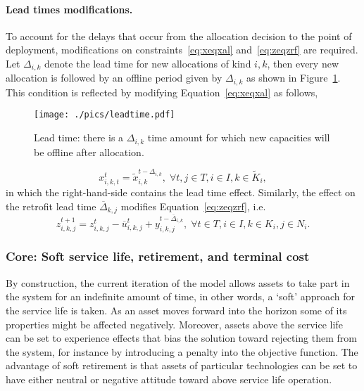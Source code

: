 \documentclass{amsart}
\begin{document}
\paragraph{Lead times modifications.}
To account for the delays that occur from the allocation decision to the point
of deployment, modifications on constraints~\eqref{eq:xeqxal} 
and~\eqref{eq:zeqzrf} are required. 
%
%
%
Let $\Delta_{i,k}$ denote the lead time for new allocations of kind $i,k$, then
every new allocation is followed by an offline period given by $\Delta_{i,k}$ as
shown in Figure~\ref{fig:leadTime}. This condition is reflected by modifying
Equation~\eqref{eq:xeqxal} as follows,
%
\begin{figure}[ht]
    \centering
    \texttt{[image: ./pics/leadtime.pdf]}
    \caption{Lead time: there is a $\Delta_{i,k}$ time amount for which new
    capacities will be offline after allocation.} \label{fig:leadTime}
\end{figure}
%
\begin{equation}
    x^t_{i,k,t} = \tilde{x}^{t-\Delta_{i,k}}_{i,k}, \; 
    \forall t,j\in T, i\in I, k\in \tilde{K}_i,
\end{equation}
%
in which the right-hand-side contains the lead time effect. 
%
Similarly, the effect on the retrofit lead time $\overline{\Delta}_{k,j}$
modifies Equation~\eqref{eq:zeqzrf}, i.e.
%
\begin{equation}
    z^{t+1}_{i,k,j} = z^{t}_{i,k,j} - \overline{u}^t_{i,k,j} + 
    y^{t-\overline{\Delta}_{i,k}}_{i,k,j},\;
    \forall 
  t \in T, i \in I, k \in K_i, j \in N_i.
\end{equation}
%
%

\subsubsection{Core: Soft service life, retirement, and terminal cost}
%
By construction, the current iteration of the model allows assets to take part
in the system for an indefinite amount of time, in other words, a `soft'
approach for the service life is taken. As an asset moves forward into the
horizon some of its properties might be affected negatively. Moreover, assets
above the service life can be set to experience effects that bias
the solution toward rejecting them from the system, for instance by introducing
a penalty into the objective function. The advantage of soft
retirement is that assets of particular technologies can be set to have either
neutral or negative attitude toward above service life operation. 
%
\end{document}
